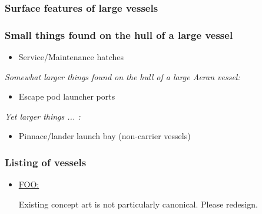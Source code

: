 \subsubsection{Surface features of large vessels}

\subsubsection{Small things found on the hull of a large  vessel}
\begin{itemize}
\item Service/Maintenance hatches
\end{itemize}
{\it Somewhat larger things found on the hull of a large Aeran vessel:}
\begin{itemize}
\item Escape pod launcher ports
\end{itemize}
{\it Yet larger things ... :}
\begin{itemize}
\item Pinnace/lander launch bay (non-carrier vessels)
\end{itemize}

\subsubsection{Listing of vessels}

\begin{itemize}
\item \href{http://vegastrike.sourceforge.net/wiki/Vessel:FOO}{FOO:} 

Existing concept art is not particularly canonical. Please redesign.

\end{itemize}

